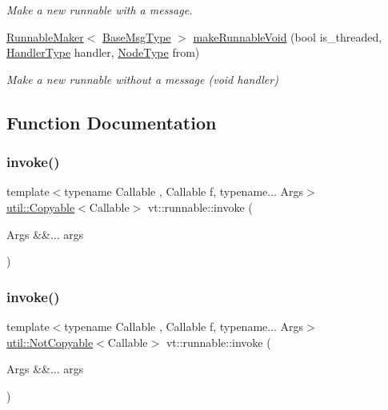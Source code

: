 \begin{DoxyCompactItemize}
\begin{DoxyCompactList}\small\item\em Make a new runnable with a message. \end{DoxyCompactList}\item 
\hyperlink{structvt_1_1runnable_1_1_runnable_maker}{Runnable\+Maker}$<$ \hyperlink{namespacevt_a44d0d4e144748f2b19a1cfd962f50338}{Base\+Msg\+Type} $>$ \hyperlink{namespacevt_1_1runnable_aa35ee520f896c49ba7f3952acb5881b2}{make\+Runnable\+Void} (bool is\+\_\+threaded, \hyperlink{namespacevt_af64846b57dfcaf104da3ef6967917573}{Handler\+Type} handler, \hyperlink{namespacevt_a866da9d0efc19c0a1ce79e9e492f47e2}{Node\+Type} from)
\begin{DoxyCompactList}\small\item\em Make a new runnable without a message (void handler) \end{DoxyCompactList}\end{DoxyCompactItemize}


\subsection{Function Documentation}
\mbox{\label{namespacevt_1_1runnable_a14fa3dbf3bef4a683fc7284452b766d3}} 
\subsubsection{\texorpdfstring{invoke()}{invoke()}\hspace{0.1cm}{\footnotesize\ttfamily [1/3]}}
{\footnotesize\ttfamily template$<$typename Callable , Callable f, typename... Args$>$ \\
\hyperlink{namespacevt_1_1util_ae9a553985cdc8e9bd4e55f55161f2929}{util\+::\+Copyable}$<$Callable$>$ vt\+::runnable\+::invoke (\begin{DoxyParamCaption}\item[{Args \&\&...}]{args }\end{DoxyParamCaption})}

\mbox{\label{namespacevt_1_1runnable_aa86b7892ea9590c2e8fef9ed0ca4e80c}} 
\subsubsection{\texorpdfstring{invoke()}{invoke()}\hspace{0.1cm}{\footnotesize\ttfamily [2/3]}}
{\footnotesize\ttfamily template$<$typename Callable , Callable f, typename... Args$>$ \\
\hyperlink{namespacevt_1_1util_a0760a3963341a602dfe2dfc42d78c867}{util\+::\+Not\+Copyable}$<$Callable$>$ vt\+::runnable\+::invoke (\begin{DoxyParamCaption}\item[{Args \&\&...}]{args }\end{DoxyParamCaption})}

